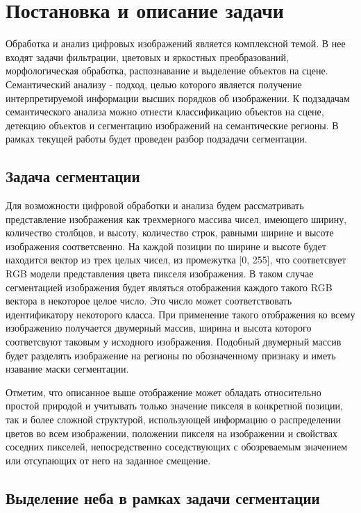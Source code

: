 \section{Постановка и описание задачи}
\label{task_description_start}

Обработка и анализ цифровых изображений является комплексной темой. В нее входят задачи фильтрации, цветовых и яркостных преобразований, морфологическая обработка, распознавание и выделение объектов на сцене. Семантический анализу - подход, целью которого является получение интерпретируемой информации высших порядков об изображении. К подзадачам семантического анализа можно отнести классификацию объектов на сцене, детекцию объектов и сегментацию изображений на семантические регионы. В рамках текущей работы будет проведен разбор подзадачи сегментации.

\subsection{Задача сегментации}

Для возможности цифровой обработки и анализа будем рассматривать представление изображения как трехмерного массива чисел, имеющего ширину, количество столбцов, и высоту, количество строк, равными ширине и высоте изображения соответсвенно. На каждой позиции по ширине и высоте будет находится вектор из трех целых чисел, из промежутка [0, 255], что соответсвует RGB модели представления цвета пикселя изображения. В таком случае сегментацией изображения будет являться отображения каждого такого RGB вектора в некоторое целое число. Это число может соответствовать идентификатору некоторого класса. При применение такого отображения ко всему изображению получается двумерный массив, ширина и высота которого соответсвуют таковым у исходного изображения. Подобный двумерный массив будет разделять изображение на регионы по обозначенному признаку и иметь нзавание маски сегментации. 

Отметим, что описанное выше отображение может обладать относительно простой природой и учитывать только значение пикселя в конкретной позиции, так и более сложной структурой, использующей информацию о распределении цветов во всем изображении, положении пикселя на изображении и свойствах соседних пикселей, непосредственно соседствующих с обозреваемым значением или отсупающих от него на заданное смещение.

\subsection{Выделение неба в рамках задачи сегментации}

